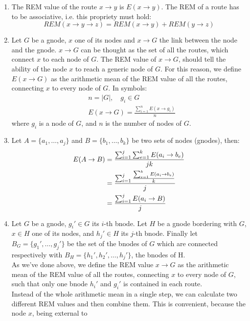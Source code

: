 \documentclass[a4paper]{article}
\begin{document}
\begin{enumerate}
	\item The REM value of the route $x\rightarrow y$ is $E(x\rightarrow
		y)$. The REM of a route has to be associative, i.e. this
		propriety must hold:
		\[
		REM(x\rightarrow y\rightarrow z)=REM(x\rightarrow
		y)+REM(y\rightarrow z)
		\]
	\item Let $G$ be a gnode, $x$ one of its nodes and $x \rightarrow G$ the
		link between the node and the gnode. $x \rightarrow G$ can be
		thought as the set of all the routes, which connect $x$ to
		each node of $G$. The REM value of $x \rightarrow G$, should
		tell the ability of the node $x$ to reach a generic node of
		$G$. For this reason, we define $E(x \rightarrow G)$ as the
		arithmetic mean of the REM value of all the routes, connecting
		$x$ to every node of $G$. In symbols:
		\begin{align*}
		&n=|G|,\quad g_i\in G\\
		&E(x\rightarrow G)=\frac{\sum_{i=1}^n E(x \rightarrow g_i)}{n}
		\end{align*}
		where $g_i$ is a node of $G$, and $n$ is the number of nodes
		of $G$.
	\item Let $A=\{a_1, \dots,a_j\}$ and $B=\{b_1,\dots,b_k\}$ be two sets 
		of nodes (gnodes), then:
		\begin{align*}
		E(A \rightarrow  B)&=
		\frac{\sum_{i=1}^j\sum_{e=1}^k E(a_i \rightarrow b_e)}{jk}\\
		&=
		\frac{\sum_{i=1}^j {\sum_{e=1}^k E(a_i \rightarrow b_e) \over
		k}}{j}\\
		&=
		\frac{\sum_{i=1}^j E(a_i \rightarrow B)}{j}
		\end{align*}
	\item Let $G$ be a gnode, $g_i' \in G$ its $i$-th bnode. Let $H$ be a
		gnode bordering with $G$, $x \in H$ one of its nodes, and
		$h_j' \in H$ its $j$-th bnode. Finally let
		$B_G=\{g_1',\dots,g_j'\}$ be the set of the bnodes of $G$ which
		are connected respectively with $B_H=\{h_1', h_2',
		\dots,h_j'\}$, the bnodes of H.\\
		As we've done above, we define the REM value $x\rightarrow G$
		as the arithmetic mean of the REM value of all the routes, connecting
		$x$ to every node of $G$, such that only one bnode $h_i'$ and
		$g_i'$ is contained in each route.\\
		Instead of the whole arithmetic mean in a single step, we can
		calculate two different REM values and then combine them.
		This is convenient, because the node $x$, being external to

\end{enumerate}
\end{document}
